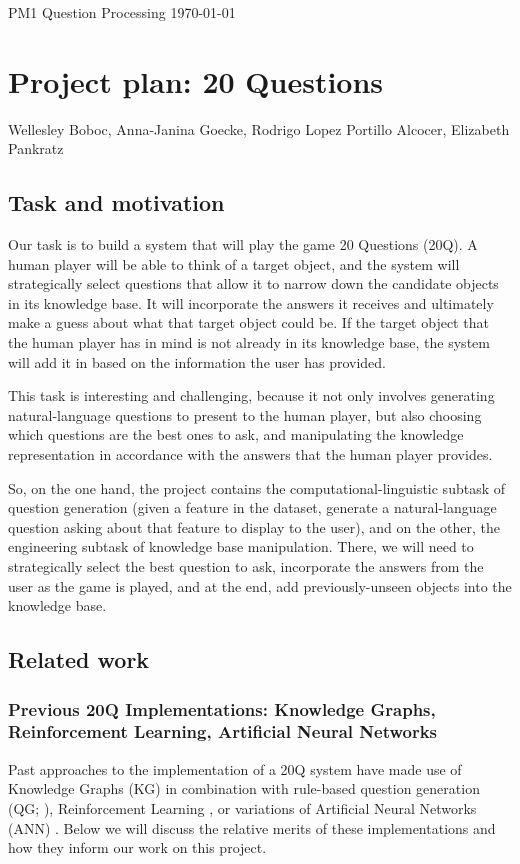 \documentclass[a4paper,12pt]{article}
\begin{document}
\noindent PM1 Question Processing \hfill \today

\vspace{-\baselineskip}

\section*{Project plan: 20 Questions}
\noindent Wellesley Boboc, Anna-Janina Goecke, Rodrigo Lopez Portillo Alcocer, Elizabeth Pankratz

\subsection*{Task and motivation}

Our task is to build a system that will play the game 20 Questions (20Q).
A human player will be able to think of a target object, and the system will strategically select questions that allow it to narrow down the candidate objects in its knowledge base.
It will incorporate the answers it receives and ultimately make a guess about what that target object could be.
If the target object that the human player has in mind is not already in its knowledge base, the system will add it in based on the information the user has provided.

This task is interesting and challenging, because it not only involves generating natural-language questions to present to the human player, but also choosing which questions are the best ones to ask, and manipulating the knowledge representation in accordance with the answers that the human player provides.

So, on the one hand, the project contains the computational-linguistic subtask of question generation (given a feature in the dataset, generate a natural-language question asking about that feature to display to the user), and on the other, the engineering subtask of knowledge base manipulation.
There, we will need to strategically select the best question to ask, incorporate the answers from the user as the game is played, and at the end, add previously-unseen objects into the knowledge base.

\subsection*{Related work}
\subsubsection*{Previous 20Q Implementations: Knowledge Graphs, Reinforcement Learning, Artificial Neural Networks}
Past approaches to the implementation of a 20Q system have made use of Knowledge Graphs (KG) in combination with rule-based question generation (QG; \citealt{DeyEa2019}), Reinforcement Learning \citep{HuEa2018}, or variations of Artificial Neural Networks (ANN) \citep{Burgener2006, ToninEa2018}. Below we will discuss the relative merits of these implementations and how they inform our work on this project.
\end{document}
